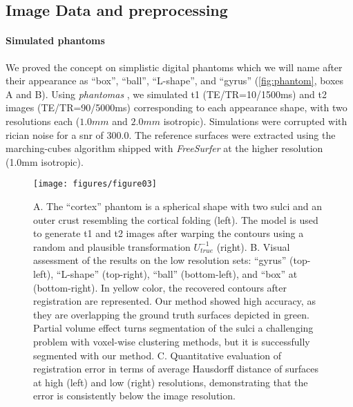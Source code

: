 \subsection*{Image Data and preprocessing}
\label{sec:datasets}

\paragraph*{Simulated phantoms}%
\label{sec:digital_phantoms}
We proved the concept on simplistic digital phantoms which we will name after their
  appearance as ``box'', ``ball'', ``L-shape'', and ``gyrus'' (\autoref{fig:phantom},
  boxes A and B).
Using \emph{phantomas} \citep{caruyer_phantomas_2014}, we simulated
  \gls*{t1} (TE/TR=10/1500ms) and \gls*{t2} images (TE/TR=90/5000ms)
  corresponding to each appearance shape, with two resolutions each
  ($1.0mm$ and $2.0mm$ isotropic).
Simulations were corrupted with rician noise for a \gls*{snr} of 300.0.
The reference surfaces were extracted using the marching-cubes algorithm
  shipped with \emph{FreeSurfer} \citep{fischl_freesurfer_2012}
  at the higher resolution (1.0mm isotropic).

\begin{figure*}
	\texttt{[image: figures/figure03]}
	\caption{A. The ``cortex'' phantom is a spherical shape with two sulci and an
	  outer crust resembling the cortical folding (left).
	The model is used to generate \gls*{t1} and \gls*{t2} images after warping the
	  contours using a random and plausible transformation $U_{true}^{-1}$ (right).
	B. Visual assessment of the results on the low resolution sets:
	  ``gyrus'' (top-left), ``L-shape'' (top-right), ``ball'' (bottom-left),
	  and ``box'' at (bottom-right).
	In yellow color, the recovered contours after registration are represented.
	Our method showed high accuracy, as they are overlapping the ground truth surfaces
	  depicted in green.
	Partial volume effect turns segmentation of the sulci a challenging problem with voxel-wise
	  clustering methods, but it is successfully segmented with our method.
	C. Quantitative evaluation of registration error in terms of average Hausdorff distance of
	  surfaces at high (left) and low (right) resolutions, demonstrating that the error is
	  consistently below the image resolution.
	  }\label{fig:phantom}
\end{figure*}

